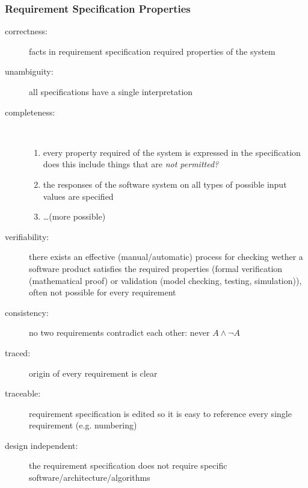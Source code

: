 \documentclass[a4paper, 10pt]{article}
\begin{document}
\subsubsection{Requirement Specification Properties}
\begin{description}
	\item[correctness:] facts in requirement specification \follows required properties of the system
	\item[unambiguity:] all specifications have a single interpretation
	\item[completeness:] \ \\
		\begin{enumerate}
			\item every property required of the system is expressed in the specification\\
			{\small does this include things that are \emph{not permitted?}}
			\item the responses of the software system on all types of possible input values are specified
			\item \dots {\small (more possible)}
		\end{enumerate}
	\item[verifiability:] there exists an effective (manual/automatic) process for checking wether a software product satisfies the required properties (formal verification (mathematical proof) or validation (model checking, testing, simulation)), often not possible for every requirement
	\item[consistency:] no two requirements contradict each other: never $A \wedge \neg A$
	\item[traced:] origin of every requirement is clear
	\item[traceable:] requirement specification is edited so it is easy to reference every single requirement (e.g. numbering)
	\item[design independent:] the requirement specification does not require specific software/architecture/algorithms
\end{description}
\end{document}
